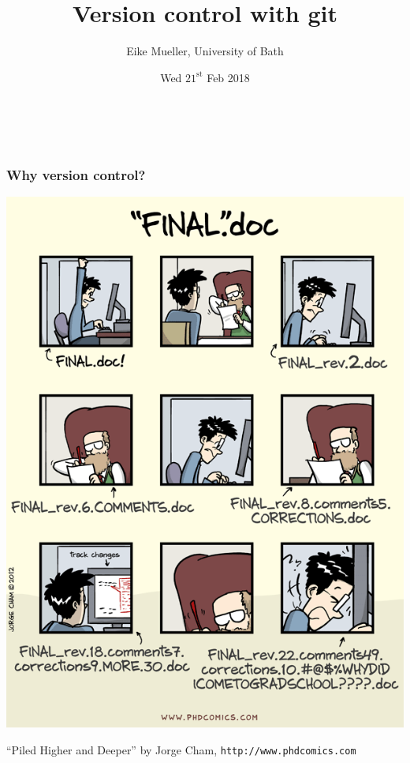 \documentclass{beamer}
\begin{document}
\title{Version control with git}
\author{Eike Mueller, University of Bath}
\date{Wed $21^{\text{st}}$ Feb 2018} 


\begin{frame}
  \frametitle{$ $}
  \titlepage
\end{frame}


\begin{frame}
  \frametitle{Why version control?}
  \begin{center}
    \includegraphics[width=0.5\linewidth]{phdcomics.png}
  \end{center}
  {\footnotesize ``Piled Higher and Deeper'' by Jorge Cham, \texttt{http://www.phdcomics.com}}
\end{frame}

\end{document}
